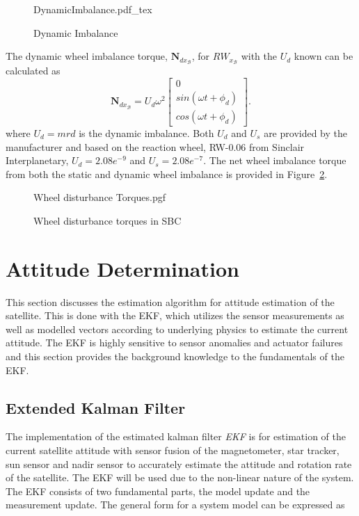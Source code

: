 \begin{figure}[!htb]
	\centering
	\def\svgwidth{10cm}
	{DynamicImbalance.pdf_tex}
	\label{fig:DynamicImbalance}
	\caption{Dynamic Imbalance}
\end{figure}
The dynamic wheel imbalance torque, $\mathbf{N}_{dx_\mathcal{B}}$, for $RW_{x_\mathcal{B}}$ with the $U_d$ known can be calculated as 
\begin{equation}
\mathbf{N}_{dx_\mathcal{B}} = U_d\omega^2 \begin{bmatrix} 0 \\ sin(\omega t + \phi_d) \\ cos(\omega t + \phi_d)\end{bmatrix}.
\end{equation}
where $U_d = mrd$ is the dynamic imbalance. Both $U_d$ and $U_s$ are provided by the manufacturer and based on the reaction wheel, RW-0.06 from Sinclair Interplanetary, $U_d = 2.08e^{-9}$ and $U_s = 2.08e^{-7}$. The net wheel imbalance torque from both the static and dynamic wheel imbalance is provided in Figure~\ref{fig:Wheel disturbance Torques}.

\begin{figure}[!htb]
	\centering
	\def\pgfwidth{10cm}
	{Wheel disturbance Torques.pgf}
	
	\caption{Wheel disturbance torques in SBC}
	\label{fig:Wheel disturbance Torques}
\end{figure}

\section{Attitude Determination}
This section discusses the estimation algorithm for attitude estimation of the satellite. This is done with the EKF, which utilizes the sensor measurements as well as modelled vectors according to underlying physics to estimate the current attitude. The EKF is highly sensitive to sensor anomalies and actuator failures and this section provides the background knowledge to the fundamentals of the EKF.

\subsection{Extended Kalman Filter}
The implementation of the estimated kalman filter \emph{EKF} is for estimation of the current satellite attitude with sensor fusion of the magnetometer, star tracker, sun sensor and nadir sensor to accurately estimate the attitude and rotation rate of the satellite. The EKF will be used due to the non-linear nature of the system. The EKF consists of two fundamental parts, the model update and the measurement update. The general form for a system model can be expressed as

